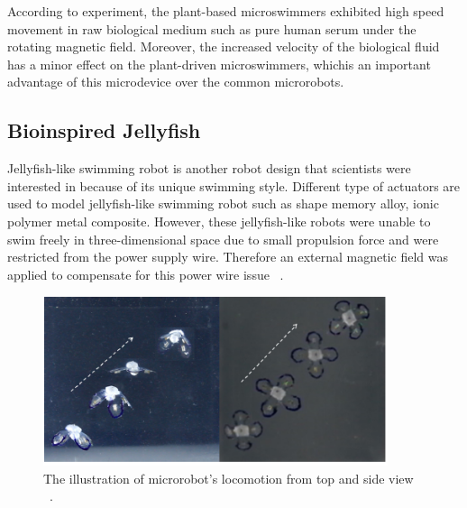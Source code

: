 \documentclass[a4paper,11pt]{article}
\begin{document}
\begin{sloppypar}
According to \citeauthor{gao2013bioinspired} experiment, the plant-based 
microswimmers exhibited high speed movement in raw biological medium such as 
pure human serum under the rotating magnetic field. Moreover, the increased velocity of the 
biological fluid has a minor effect on the plant-driven microswimmers, whichis an important 
advantage of this microdevice over the common microrobots.



\subsection{Bioinspired Jellyfish}
Jellyfish-like swimming robot is another robot design that scientists were interested 
in because of its unique swimming style. Different type of actuators are used to model
 jellyfish-like swimming robot such as shape memory alloy, ionic polymer metal 
composite. However, these jellyfish-like robots were unable to swim freely in 
three-dimensional space due to small propulsion force and were restricted from
 the power supply wire. Therefore an external magnetic field was applied to compensate 
for this power wire issue ~\citep{ko2012jellyfish}.

\begin{figure}
  \centering
    \includegraphics[width=0.9\textwidth]{jellyfish}
  \caption{ The illustration of microrobot\rq{}s locomotion from top and side view ~\citep{ko2012jellyfish}.}
  \label{jellyfish}
\end{figure}


\end{sloppypar}
\end{document}
